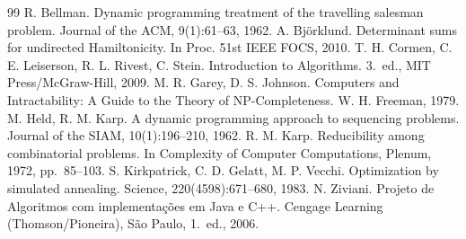 \documentclass[12pt,a4paper]{article}
\begin{document}
\begin{thebibliography}{99}
 R. Bellman. Dynamic programming treatment of the travelling salesman problem. Journal of the ACM, 9(1):61--63, 1962.
 A. Björklund. Determinant sums for undirected Hamiltonicity. In Proc. 51st IEEE FOCS, 2010.
 T. H. Cormen, C. E. Leiserson, R. L. Rivest, C. Stein. Introduction to Algorithms. 3.\ ed., MIT Press/McGraw-Hill, 2009.
 M. R. Garey, D. S. Johnson. Computers and Intractability: A Guide to the Theory of NP-Completeness. W. H. Freeman, 1979.
 M. Held, R. M. Karp. A dynamic programming approach to sequencing problems. Journal of the SIAM, 10(1):196--210, 1962.
 R. M. Karp. Reducibility among combinatorial problems. In Complexity of Computer Computations, Plenum, 1972, pp.\ 85--103.
 S. Kirkpatrick, C. D. Gelatt, M. P. Vecchi. Optimization by simulated annealing. Science, 220(4598):671--680, 1983.
 N. Ziviani. Projeto de Algoritmos com implementações em Java e C++. Cengage Learning (Thomson/Pioneira), São Paulo, 1.\ ed., 2006.
\end{thebibliography}
\end{document}
